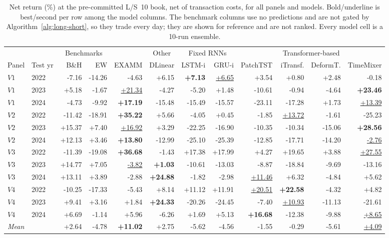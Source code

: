 \begin{table}[t]
\centering
\caption{Net return (\%) at the pre-committed L/S~10 book, net of transaction costs, for all panels and models. Bold/underline is best/second per row among the model columns. The benchmark columns use no predictions and are not gated by Algorithm~\ref{alg:long-short}, so they trade every day; they are shown for reference and are not ranked. Every model cell is a 10-run ensemble.}
\label{tab:net-returns}
\begin{tabular}{llrrrrrrrrrr}
\toprule
 & & \multicolumn{2}{c}{Benchmarks} &  & \multicolumn{1}{c}{Other} & \multicolumn{2}{c}{Fixed RNNs} & \multicolumn{4}{c}{Transformer-based} \\
\cmidrule(lr){3-4} \cmidrule(lr){6-6} \cmidrule(lr){7-8} \cmidrule(lr){9-12}
Panel & Test yr & B\&H & EW & EXAMM & DLinear & LSTM-i & GRU-i & PatchTST & iTransf. & DeformT. & TimeMixer \\
\midrule
$V1$ & 2022 & -7.16 & -14.26 & -4.63 & +6.15 & \textbf{+7.13} & \underline{+6.65} & +3.54 & +0.80 & +2.48 & -0.18 \\
$V1$ & 2023 & +5.18 & -1.67 & \underline{+21.34} & -4.27 & -5.20 & +1.48 & -10.61 & -0.94 & -4.64 & \textbf{+23.46} \\
$V1$ & 2024 & -4.73 & -9.92 & \textbf{+17.19} & -15.48 & -15.49 & -15.57 & -23.11 & -17.28 & +1.73 & \underline{+13.39} \\
\addlinespace
$V2$ & 2022 & -11.42 & -18.91 & \textbf{+35.22} & +5.66 & -4.05 & +0.45 & -1.85 & \underline{+13.72} & -1.61 & -25.23 \\
$V2$ & 2023 & +15.37 & +7.40 & \underline{+16.92} & +3.29 & -22.25 & -16.90 & -10.35 & -10.34 & -15.06 & \textbf{+28.56} \\
$V2$ & 2024 & +12.13 & +3.46 & \textbf{+13.80} & -12.99 & -25.10 & -25.39 & -12.85 & -17.71 & -14.20 & \underline{-2.76} \\
\addlinespace
$V3$ & 2022 & -11.39 & -19.08 & \textbf{+36.68} & -1.43 & +17.38 & +17.99 & +4.27 & +19.65 & +3.88 & \underline{+27.55} \\
$V3$ & 2023 & +14.77 & +7.05 & \underline{-3.82} & \textbf{+1.03} & -10.61 & -13.03 & -8.87 & -18.84 & -9.69 & -13.16 \\
$V3$ & 2024 & +13.11 & +3.89 & -2.88 & \textbf{+24.88} & -1.82 & -2.98 & \underline{+11.46} & +6.32 & -4.84 & +5.62 \\
\addlinespace
$V4$ & 2022 & -10.25 & -17.33 & -5.43 & +8.14 & +11.12 & +11.91 & \underline{+20.51} & \textbf{+22.58} & -4.32 & +4.82 \\
$V4$ & 2023 & +9.41 & +3.16 & +1.84 & \textbf{+24.33} & -20.26 & -24.45 & -7.40 & \underline{+10.93} & -11.13 & -21.61 \\
$V4$ & 2024 & +6.69 & -1.14 & +5.96 & -6.26 & +1.69 & +5.13 & \textbf{+16.68} & -12.38 & -9.88 & \underline{+8.65} \\
\midrule
\multicolumn{2}{l}{\textit{Mean}} & +2.64 & -4.78 & \textbf{+11.02} & +2.75 & -5.62 & -4.56 & -1.55 & -0.29 & -5.61 & \underline{+4.09} \\
\bottomrule
\end{tabular}
\end{table}
